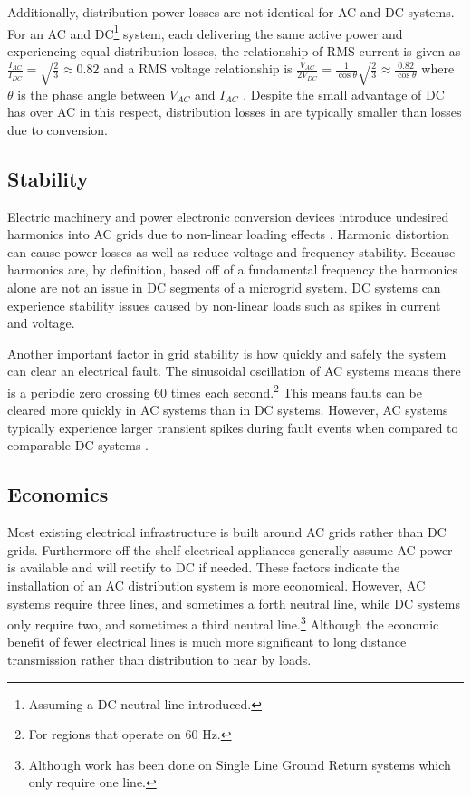  

Additionally, distribution power losses are not identical for AC and DC systems. For an AC and DC\footnote{Assuming a DC neutral line introduced.} system, each delivering the same active power and experiencing equal distribution losses, the relationship of RMS current is given as $\frac{I_{AC}}{I_{DC}} = \sqrt{\frac{2}{3}} \approx 0.82$ and a RMS voltage relationship is $\frac{V_{AC}}{2V_{DC}} = \frac{1}{\cos{\theta}} \sqrt{\frac{2}{3}} \approx \frac{0.82}{\cos{\theta}}$ where $\theta$ is the phase angle between $V_{AC}$ and $I_{AC}$ \cite{Starke2008}. Despite the small advantage of DC has over AC in this respect, distribution losses in are typically smaller than losses due to conversion.

\subsection{Stability}
Electric machinery and power electronic conversion devices introduce undesired harmonics into AC grids due to non-linear loading effects \cite{Grotzbach1997}. Harmonic distortion can cause power losses as well as reduce voltage and frequency stability. Because harmonics are, by definition, based off of a fundamental frequency the harmonics alone are not an issue in DC segments of a microgrid system. DC systems can experience stability issues caused by non-linear loads such as spikes in current and voltage.

Another important factor in grid stability is how quickly and safely the system can clear an electrical fault. The sinusoidal oscillation of AC systems means there is a periodic zero crossing 60 times each second.\footnote{For regions that operate on 60 Hz.} This means faults can be cleared more quickly in AC systems than in DC systems.  However, AC systems typically experience larger transient spikes during fault events when compared to comparable DC systems \cite{Estes2011}. 

\subsection{Economics}
Most existing electrical infrastructure is built around AC grids rather than DC grids. Furthermore off the shelf electrical appliances generally assume AC power is available and will rectify to DC if needed. These factors indicate the installation of an AC distribution system is more economical. However, AC systems require three lines, and sometimes a forth neutral line, while DC systems only require two, and sometimes a third neutral line.\footnote{Although work has been done on Single Line Ground Return systems which only require one line.} Although the economic benefit of fewer electrical lines is much more significant to long distance transmission rather than distribution to near by loads.

